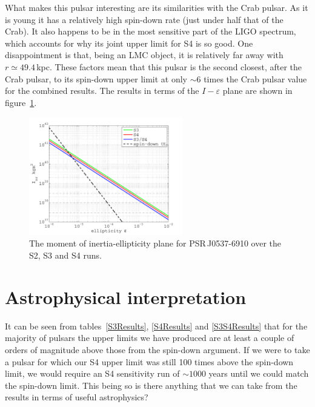 What makes this pulsar interesting are its similarities with the Crab pulsar. As it is young it has
a relatively high spin-down rate (just under half that of the Crab). It also happens to be in the
most sensitive part of the LIGO spectrum, which accounts for why its joint upper limit for S4 is so
good. One disappointment is that, being an LMC object, it is relatively far away with $r \simeq
49.4$\,kpc. These factors mean that this pulsar is the second closest, after the Crab pulsar, to its
spin-down upper limit at only $\sim 6$ times the Crab pulsar value for the combined results. The
results in terms of the $I-\varepsilon$ plane are shown in
figure~\ref{J0537-6910Ieplane}.
\begin{figure}[!htbp]
\begin{center}
\includegraphics[width=0.6\textwidth]{figs/J0537-6910Ieplane}\caption{The moment of
inertia-ellipticity plane for PSR\,J0537-6910 over the S2, S3 and S4 runs.}\label{J0537-6910Ieplane}
\end{center}
\end{figure}


\section{Astrophysical interpretation}\label{astrophysics}
It can be seen from tables~\ref{S3Results}, \ref{S4Results} and \ref{S3S4Results} that for the
majority of pulsars the upper limits we have produced are at least a couple of orders of magnitude
above those from the spin-down argument. If we were to take a pulsar for which our S4 upper limit
was still 100 times above the spin-down limit, we would require an S4 sensitivity run of $\sim 1000$
years until we could match the spin-down limit. This being so is there anything that we can take
from the results in terms of useful astrophysics?

